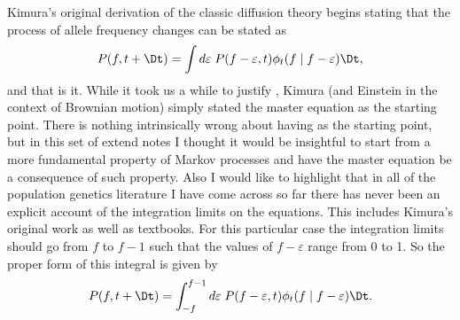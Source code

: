 Kimura's original derivation of the classic diffusion theory begins stating
that the process of allele frequency changes can be stated as
\begin{equation}
  P(f, t + \Dt) = \int d\varepsilon \;
  P(f - \varepsilon, t) \phi_t(f \mid f - \varepsilon) \Dt,
  \label{eq_kimura_master}
\end{equation}
and that is it. While it took us a while to justify ,
Kimura (and Einstein in the context of Brownian motion) simply stated the
master equation as the starting point. There is nothing intrinsically wrong
about having  as the starting point, but in this set of
extend notes I thought it would be insightful to start from a more fundamental
property of Markov processes and have the master equation be a consequence of
such property. Also I would like to highlight that in all of the population
genetics literature I have come across so far there has never been an explicit
account of the integration limits on the equations. This includes Kimura's
original work as well as textbooks. For this particular case the integration
limits should go from $f$ to $f - 1$ such that the values of $f - \varepsilon$
range from 0 to 1. So the proper form of this integral is given by
\begin{equation}
  P(f, t + \Dt) = \int_{-f}^{f - 1} d\varepsilon \;
  P(f - \varepsilon, t) \phi_t(f \mid f - \varepsilon) \Dt.
  \label{eq_kimura_master_lim}
\end{equation}

